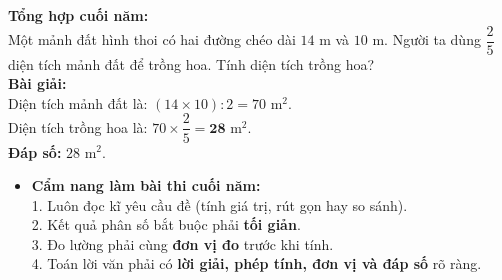 \documentclass[14pt,a4paper,oneside]{extbook}
\begin{document}
\vspace{-2.5mm}
\noindent
\begin{minipage}[t]{0.49\textwidth}\vspace{0pt}
\begin{tcolorbox}[
  enhanced,
  colback=green!4!white,
  colframe=green!60!black,
  arc=2mm, boxrule=0.8pt,
  left=2mm, right=2mm, top=1.8mm, bottom=1.8mm,
  title={\footnotesize\bfseries\color{white}\faCheckCircle\ Ví dụ thực hành chuẩn mực}
]
{\footnotesize
\textbf{Tổng hợp cuối năm:}\\
Một mảnh đất hình thoi có hai đường chéo dài $14\text{ m}$ và $10\text{ m}$. Người ta dùng $\dfrac{2}{5}$ diện tích mảnh đất để trồng hoa. Tính diện tích trồng hoa?\\
\textbf{Bài giải:}\\
Diện tích mảnh đất là: $(14 \times 10) : 2 = 70\text{ m}^2$.\\
Diện tích trồng hoa là: $70 \times \dfrac{2}{5} = \mathbf{28}\text{ m}^2$.\\
\textbf{Đáp số:} $28\text{ m}^2$.
}
\end{tcolorbox}
\end{minipage}
\hfill
\begin{minipage}[t]{0.49\textwidth}\vspace{0pt}
\begin{tcolorbox}[
  enhanced,
  colback=red!4!white,
  colframe=red!70!black,
  arc=2mm, boxrule=0.8pt,
  left=2mm, right=2mm, top=1.8mm, bottom=1.8mm,
  title={\footnotesize\bfseries\color{white}\faExclamationTriangle\ Mẹo tránh bẫy trắc nghiệm}
]
{\footnotesize
\begin{itemize}\setlength{\itemsep}{1.5pt}\setlength{\leftskip}{-2.5mm}
  \item \textbf{Cẩm nang làm bài thi cuối năm:}\\
  1. Luôn đọc kĩ yêu cầu đề (tính giá trị, rút gọn hay so sánh).\\
  2. Kết quả phân số bắt buộc phải \textbf{tối giản}.\\
  3. Đo lường phải cùng \textbf{đơn vị đo} trước khi tính.\\
  4. Toán lời văn phải có \textbf{lời giải, phép tính, đơn vị và đáp số} rõ ràng.
\end{itemize}
}
\end{tcolorbox}
\end{minipage}
\end{document}

